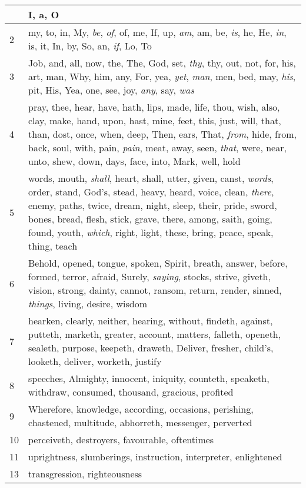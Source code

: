 \begin{longtable}{l|p{3.75in}}
\hline \hline
\endlastfoot
1 & I, a, O \\ \hline
2 & my, to, in, My, \emph{be}, \emph{of}, of, me, If, up, \emph{am}, am, be, \emph{is}, he, He, \emph{in}, is, it, In, by, So, an, \emph{if}, Lo, To \\ \hline
3 & Job, and, all, now, the, The, God, set, \emph{thy}, thy, out, not, for, his, art, man, Why, him, any, For, yea, \emph{yet}, \emph{man}, men, bed, may, \emph{his}, pit, His, Yea, one, see, joy, \emph{any}, say, \emph{was} \\ \hline
4 & pray, thee, hear, have, hath, lips, made, life, thou, wish, also, clay, make, hand, upon, hast, mine, feet, this, just, will, that, than, dost, once, when, deep, Then, ears, That, \emph{from}, hide, from, back, soul, with, pain, \emph{pain}, meat, away, seen, \emph{that}, were, near, unto, shew, down, days, face, into, Mark, well, hold \\ \hline
5 & words, mouth, \emph{shall}, heart, shall, utter, given, canst, \emph{words}, order, stand, God's, stead, heavy, heard, voice, clean, \emph{there}, enemy, paths, twice, dream, night, sleep, their, pride, sword, bones, bread, flesh, stick, grave, there, among, saith, going, found, youth, \emph{which}, right, light, these, bring, peace, speak, thing, teach \\ \hline
6 & Behold, opened, tongue, spoken, Spirit, breath, answer, before, formed, terror, afraid, Surely, \emph{saying}, stocks, strive, giveth, vision, strong, dainty, cannot, ransom, return, render, sinned, \emph{things}, living, desire, wisdom \\ \hline
7 & hearken, clearly, neither, hearing, without, findeth, against, putteth, marketh, greater, account, matters, falleth, openeth, sealeth, purpose, keepeth, draweth, Deliver, fresher, child's, looketh, deliver, worketh, justify \\ \hline
8 & speeches, Almighty, innocent, iniquity, counteth, speaketh, withdraw, consumed, thousand, gracious, profited \\ \hline
9 & Wherefore, knowledge, according, occasions, perishing, chastened, multitude, abhorreth, messenger, perverted \\ \hline
10 & perceiveth, destroyers, favourable, oftentimes \\ \hline
11 & uprightness, slumberings, instruction, interpreter, enlightened \\ \hline
13 & transgression, righteousness \\ \hline
\end{longtable}






